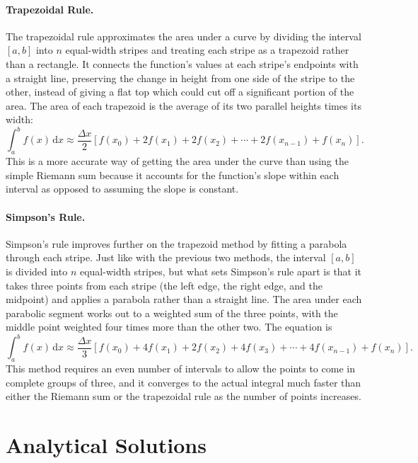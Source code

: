 \documentclass[11pt]{article}
\newcommand{\dd}{\mathrm{d}}
\begin{document}
\paragraph{Trapezoidal Rule.} The trapezoidal rule approximates the area under a curve by dividing the interval $[a,b]$ into $n$ equal-width stripes and treating each stripe as a trapezoid rather than a rectangle. It connects the function's values at each stripe's endpoints with a straight line, preserving the change in height from one side of the stripe to the other, instead of giving a flat top which could cut off a significant portion of the area. The area of each trapezoid is the average of its two parallel heights times its width:
\begin{equation}
  \int_a^b f(x)\,\dd x \approx \frac{\Delta x}{2}\left[f(x_0) + 2f(x_1) + 2f(x_2) + \cdots + 2f(x_{n-1}) + f(x_n)\right].
\end{equation}
This is a more accurate way of getting the area under the curve than using the simple Riemann sum because it accounts for the function's slope within each interval as opposed to assuming the slope is constant.

\paragraph{Simpson's Rule.} Simpson's rule improves further on the trapezoid method by fitting a parabola through each stripe. Just like with the previous two methods, the interval $[a,b]$ is divided into $n$ equal-width stripes, but what sets Simpson's rule apart is that it takes three points from each stripe (the left edge, the right edge, and the midpoint) and applies a parabola rather than a straight line. The area under each parabolic segment works out to a weighted sum of the three points, with the middle point weighted four times more than the other two. The equation is
\begin{equation}
  \int_a^b f(x)\,\dd x \approx \frac{\Delta x}{3}\left[f(x_0) + 4f(x_1) + 2f(x_2) + 4f(x_3) + \cdots + 4f(x_{n-1}) + f(x_n)\right].
\end{equation}
This method requires an even number of intervals to allow the points to come in complete groups of three, and it converges to the actual integral much faster than either the Riemann sum or the trapezoidal rule as the number of points increases.

\section{Analytical Solutions}
\end{document}
